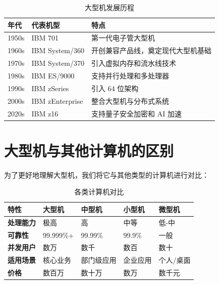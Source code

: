 \documentclass[12pt,UTF8]{ctexbook}
\begin{document}
\begin{table}[htbp]
    \centering
    \caption{大型机发展历程}
    \begin{tabular}{|p{2cm}|p{3cm}|p{5cm}|}
        \hline
        \textbf{年代} & \textbf{代表机型} & \textbf{特点} \\
        \hline
        1950s & IBM 701 & 第一代电子管大型机 \\
        \hline
        1960s & IBM System/360 & 开创兼容产品线，奠定现代大型机基础 \\
        \hline
        1970s & IBM System/370 & 引入虚拟内存和流水线技术 \\
        \hline
        1980s & IBM ES/9000 & 支持并行处理和多处理器 \\
        \hline
        1990s & IBM zSeries & 引入 64 位架构 \\
        \hline
        2000s & IBM zEnterprise & 整合大型机与分布式系统 \\
        \hline
        2020s & IBM z16 & 支持量子安全加密和 AI 加速 \\
        \hline
    \end{tabular}
\end{table}

\section{大型机与其他计算机的区别}

为了更好地理解大型机，我们将它与其他类型的计算机进行对比：

\begin{table}[htbp]
    \centering
    \caption{各类计算机对比}
    \begin{tabular}{|p{2cm}|p{2cm}|p{2cm}|p{2cm}|p{2cm}|}
        \hline
        \textbf{特性} & \textbf{大型机} & \textbf{中型机} & \textbf{小型机} & \textbf{微型机} \\
        \hline
        \textbf{处理能力} & 极高 & 高 & 中等 & 低-中 \\
        \hline
        \textbf{可靠性} & 99.999\%+ & 99.99\% & 99.9\% & 一般 \\
        \hline
        \textbf{并发用户} & 数万 & 数千 & 数百 & 数十 \\
        \hline
        \textbf{适用场景} & 核心业务 & 部门级应用 & 企业应用 & 个人/桌面 \\
        \hline
        \textbf{价格} & 数百万 & 数十万 & 数万 & 数千元 \\
        \hline
    \end{tabular}
\end{table}
\end{document}
